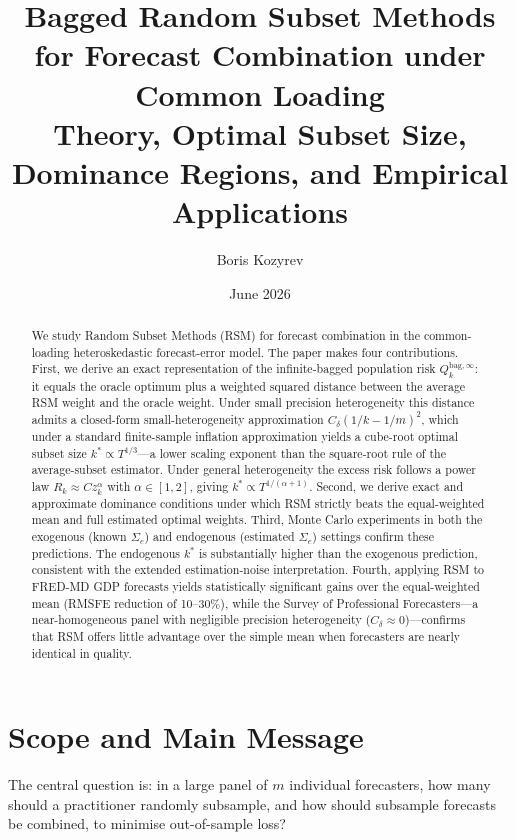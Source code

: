 \documentclass[12pt,a4paper]{article}
\title{\textbf{Bagged Random Subset Methods for Forecast Combination
       under Common Loading}\\[0.4em]
       \large Theory, Optimal Subset Size, Dominance Regions,
               and Empirical Applications}
\author{Boris Kozyrev}
\date{June 2026}
\theoremstyle{definition}
\begin{document}
\maketitle

\begin{abstract}
We study Random Subset Methods (RSM) for forecast combination in the
common-loading heteroskedastic forecast-error model. The paper makes four
contributions. First, we derive an exact representation of the infinite-bagged
population risk $Q_k^{\mathrm{bag},\infty}$: it equals the oracle optimum plus
a weighted squared distance between the average RSM weight and the oracle weight.
Under small precision heterogeneity this distance admits a closed-form
small-heterogeneity approximation $C_\delta(1/k-1/m)^2$, which under a
standard finite-sample inflation approximation yields a cube-root optimal subset
size $k^*\propto T^{1/3}$---a lower scaling exponent than the square-root rule
of the average-subset estimator. Under general heterogeneity the excess risk
follows a power law $R_k\approx Cz_k^\alpha$ with $\alpha\in[1,2]$, giving
$k^*\propto T^{1/(\alpha+1)}$. Second, we derive exact and approximate
dominance conditions under which RSM strictly beats the equal-weighted mean and
full estimated optimal weights. Third, Monte Carlo experiments in both the
exogenous (known $\Sigma_e$) and endogenous (estimated $\Sigma_e$) settings
confirm these predictions. The endogenous $k^*$ is substantially higher than
the exogenous prediction, consistent with the extended estimation-noise
interpretation. Fourth, applying RSM to FRED-MD GDP forecasts yields
statistically significant gains over the equal-weighted mean (RMSFE reduction
of 10--30\%), while the Survey of Professional Forecasters---a near-homogeneous
panel with negligible precision heterogeneity ($C_\delta\approx0$)---confirms
that RSM offers little advantage over the simple mean when forecasters are
nearly identical in quality.
\end{abstract}

\tableofcontents
\newpage

\section{Scope and Main Message}

The central question is: in a large panel of $m$ individual forecasters, how
many should a practitioner randomly subsample, and how should subsample
forecasts be combined, to minimise out-of-sample loss?
\end{document}
